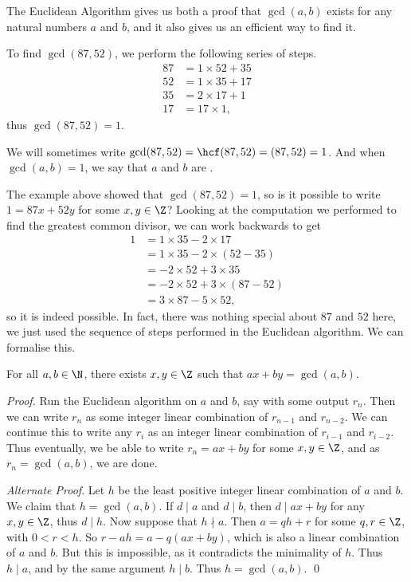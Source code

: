 \documentclass[a4paper]{scrreprt}
\begin{document}
The Euclidean Algorithm gives us both a proof that $\gcd(a, b)$ exists for any natural numbers $a$ and $b$, and it also gives us an efficient way to find it.

\begin{example}
	To find $\gcd(87, 52)$, we perform the following series of steps.
	\begin{align*}
		87 &= 1 \times 52 + 35 \\
		52 &= 1 \times 35 + 17 \\
		35 &= 2 \times 17 + 1\\
		17 &= 17 \times 1,
	\end{align*}
	thus $\gcd(87, 52) = 1$.
\end{example}

\begin{notation}
	We will sometimes write $\gcd(87, 52) = \hcf(87, 52) = (87, 52) = 1$. And when $\gcd(a, b) = 1$, we say that $a$ and $b$ are .
\end{notation}

The example above showed that $\gcd(87, 52) = 1$, so is it possible to write $1 = 87x + 52y$ for some $x,y \in \Z$?
Looking at the computation we performed to find the greatest common divisor, we can work backwards to get
\begin{align*}
	1 &= 1 \times 35 - 2 \times 17 \\
	  &= 1 \times 35 - 2 \times (52 - 35) \\
	  &= -2 \times 52 + 3 \times 35 \\
	  &= -2\times 52 + 3 \times (87 - 52) \\
	  &= 3\times 87 - 5 \times 52,
\end{align*}
so it is indeed possible. In fact, there was nothing special about $87$ and $52$ here, we just used the sequence of steps performed in the Euclidean algorithm. We can formalise this.

\begin{theorem}
	For all $a, b \in \N$, there exists $x, y \in \Z$ such that $ax + by = \gcd(a, b)$.
\end{theorem}
\begin{proof} 
	Run the Euclidean algorithm on $a$ and $b$, say with some output $r_n$. Then we can write $r_n$ as some integer linear combination of $r_{n - 1}$ and $r_{n - 2}$.
	We can continue this to write any $r_i$ as an integer linear combination of $r_{i - 1}$ and $r_{i - 2}$. Thus eventually, we be able to write $r_n = ax + by$ for some $x, y \in \Z$, and as $r_n = \gcd(a, b)$, we are done. \hfill \qedhere

	\emph{Alternate Proof}. Let $h$ be the least positive integer linear combination of $a$ and $b$. We claim that $h = \gcd(a, b)$. If $d \mid a$ and $d \mid b$, then $d \mid ax + by$ for any $x, y \in \Z$, thus $d \mid h$. Now suppose that $h \nmid a$. Then $a = qh + r$ for some $q, r \in \Z$, with $0 < r < h$. So $r - ah = a - q(ax + by)$, which is also a linear combination of $a$ and $b$. But this is impossible, as it contradicts the minimality of $h$. Thus $h \mid a$, and by the same argument $h \mid b$. Thus $h = \gcd(a, b)$. \hfill \qed
\end{proof}
\end{document}
